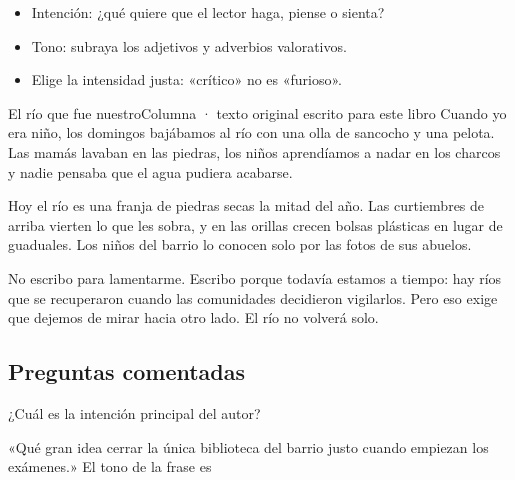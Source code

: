
\begin{regla}
\begin{itemize}
  \item Intención: ¿qué quiere que el lector haga, piense o sienta?
  \item Tono: subraya los adjetivos y adverbios valorativos.
  \item Elige la intensidad justa: «crítico» no es «furioso».
\end{itemize}
\end{regla}

\begin{texto}{El río que fue nuestro}{Columna · texto original escrito para este libro}
\pa Cuando yo era niño, los domingos bajábamos al río con una olla de sancocho y una pelota. Las mamás lavaban en las
piedras, los niños aprendíamos a nadar en los charcos y nadie pensaba que el agua pudiera acabarse.

\pa Hoy el río es una franja de piedras secas la mitad del año. Las curtiembres de arriba vierten lo que les sobra, y en
las orillas crecen bolsas plásticas en lugar de guaduales. Los niños del barrio lo conocen solo por las fotos de sus
abuelos.

\pa No escribo para lamentarme. Escribo porque todavía estamos a tiempo: hay ríos que se recuperaron cuando las
comunidades decidieron vigilarlos. Pero eso exige que dejemos de mirar hacia otro lado. El río no volverá solo.
\end{texto}

\subsection{Preguntas comentadas}
\begin{comentada}{¿Cuál es la intención principal del autor?}
\end{comentada}

\begin{reto}
«Qué gran idea cerrar la única biblioteca del barrio justo cuando empiezan los exámenes.» El tono de la frase es
\end{reto}

